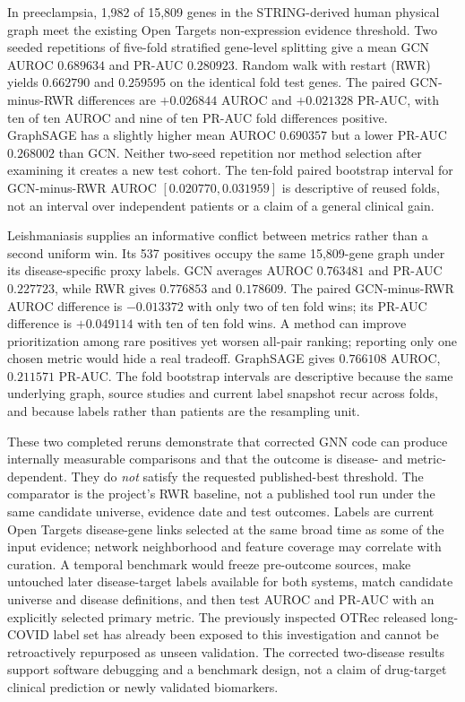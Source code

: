 \documentclass[11pt,a4paper]{article}
\begin{document}
In preeclampsia, 1,982 of 15,809 genes in the STRING-derived human physical graph meet the existing Open Targets non-expression evidence threshold. Two seeded repetitions of five-fold stratified gene-level splitting give a mean GCN AUROC $0.689634$ and PR-AUC $0.280923$. Random walk with restart (RWR) yields $0.662790$ and $0.259595$ on the identical fold test genes. The paired GCN-minus-RWR differences are $+0.026844$ AUROC and $+0.021328$ PR-AUC, with ten of ten AUROC and nine of ten PR-AUC fold differences positive. GraphSAGE has a slightly higher mean AUROC $0.690357$ but a lower PR-AUC $0.268002$ than GCN. Neither two-seed repetition nor method selection after examining it creates a new test cohort. The ten-fold paired bootstrap interval for GCN-minus-RWR AUROC $[0.020770,0.031959]$ is descriptive of reused folds, not an interval over independent patients or a claim of a general clinical gain.

Leishmaniasis supplies an informative conflict between metrics rather than a second uniform win. Its 537 positives occupy the same 15,809-gene graph under its disease-specific proxy labels. GCN averages AUROC $0.763481$ and PR-AUC $0.227723$, while RWR gives $0.776853$ and $0.178609$. The paired GCN-minus-RWR AUROC difference is $-0.013372$ with only two of ten fold wins; its PR-AUC difference is $+0.049114$ with ten of ten fold wins. A method can improve prioritization among rare positives yet worsen all-pair ranking; reporting only one chosen metric would hide a real tradeoff. GraphSAGE gives $0.766108$ AUROC, $0.211571$ PR-AUC. The fold bootstrap intervals are descriptive because the same underlying graph, source studies and current label snapshot recur across folds, and because labels rather than patients are the resampling unit.

These two completed reruns demonstrate that corrected GNN code can produce internally measurable comparisons and that the outcome is disease- and metric-dependent. They do \emph{not} satisfy the requested published-best threshold. The comparator is the project's RWR baseline, not a published tool run under the same candidate universe, evidence date and test outcomes. Labels are current Open Targets disease-gene links selected at the same broad time as some of the input evidence; network neighborhood and feature coverage may correlate with curation. A temporal benchmark would freeze pre-outcome sources, make untouched later disease-target labels available for both systems, match candidate universe and disease definitions, and then test AUROC and PR-AUC with an explicitly selected primary metric. The previously inspected OTRec released long-COVID label set has already been exposed to this investigation and cannot be retroactively repurposed as unseen validation. The corrected two-disease results support software debugging and a benchmark design, not a claim of drug-target clinical prediction or newly validated biomarkers.
\end{document}
